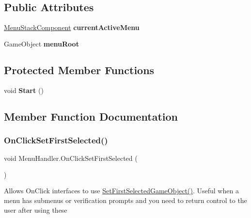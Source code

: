 \subsection*{Public Attributes}
\begin{DoxyCompactItemize}
\item 
\hypertarget{class_menu_handler_a55166fdef8198e2d624f6178f19a5d57}{}\label{class_menu_handler_a55166fdef8198e2d624f6178f19a5d57} 
\hyperlink{class_menu_stack_component}{Menu\+Stack\+Component} {\bfseries current\+Active\+Menu}
\item 
\hypertarget{class_menu_handler_ab3b3d0dd363a6147bf6cfb35b7e540f6}{}\label{class_menu_handler_ab3b3d0dd363a6147bf6cfb35b7e540f6} 
Game\+Object {\bfseries menu\+Root}
\end{DoxyCompactItemize}
\subsection*{Protected Member Functions}
\begin{DoxyCompactItemize}
\item 
\hypertarget{class_menu_handler_a7acc1c0116dcb9e578892eff4077e08d}{}\label{class_menu_handler_a7acc1c0116dcb9e578892eff4077e08d} 
void {\bfseries Start} ()
\end{DoxyCompactItemize}


\subsection{Member Function Documentation}
\hypertarget{class_menu_handler_a94e4c33184497dd1ec9d1088f8b29d6f}{}\label{class_menu_handler_a94e4c33184497dd1ec9d1088f8b29d6f} 
\subsubsection{\texorpdfstring{On\+Click\+Set\+First\+Selected()}{OnClickSetFirstSelected()}}
{\footnotesize\ttfamily void Menu\+Handler.\+On\+Click\+Set\+First\+Selected (\begin{DoxyParamCaption}{ }\end{DoxyParamCaption})}



Allows On\+Click interfaces to use \hyperlink{class_menu_handler_a9a847d363279e4b969a3584ee4134e50}{Set\+First\+Selected\+Game\+Object()}. Useful when a menu has submenus or verification prompts and you need to return control to the user after using these 


